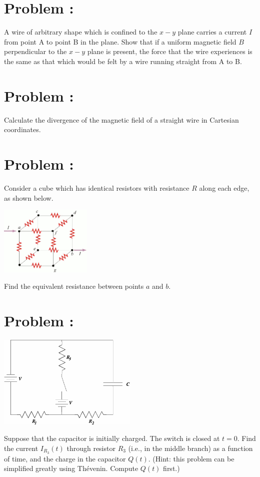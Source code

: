 \documentclass[problems]{esg8022pset}
\begin{document}
\section{Problem \thesection: }
  A wire of arbitrary shape which is confined to the $x-y$ plane carries a current $I$ from point A to point B in the plane. Show that if a uniform magnetic field $B$ perpendicular to the $x-y$ plane is present, the force that the wire experiences is the same as that which would be felt by a wire running straight from A to B.
\section{Problem \thesection: }
  Calculate the divergence of the magnetic field of a straight wire in Cartesian coordinates.
\section{Problem \thesection: }
  Consider a cube which has identical resistors with resistance $R$ along each edge, as shown below.
  \begin{center}\includegraphics[width=0.33\textwidth]{ps07_06}\end{center}
  Find the equivalent resistance between points $a$ and $b$.
\section{Problem \thesection: }
  \begin{center}\includegraphics[width=0.5\textwidth]{ps07_07}\end{center}
  Suppose that the capacitor is initially charged.  The switch is closed at $t = 0$.  Find the current $I_{R_3}(t)$ through resistor $R_3$ (i.e., in the middle branch) as a function of time, and the charge in the capacitor $Q(t)$.  (Hint: this problem can be simplified greatly using Th\'evenin.  Compute $Q(t)$ first.)
\end{document}
